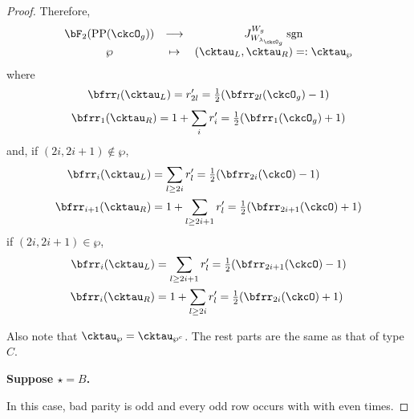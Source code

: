 \documentclass[12pt,a4paper]{amsart}
\newcommand{\sgn}{\operatorname{sgn}}
\numberwithin{equation}{section}
\theoremstyle{remark}
\def\half{{\tfrac{1}{2}}}
\def\lamckg{\lambda_{\ckcO_g}}
\def\CPP{\mathrm{PP}}
\begin{document}
\begin{proof}
{      Therefore,
      \[
        \begin{array}{ccc}
          \bF_{2}(\CPP(\ckcO_{g}))&\longrightarrow
          & J_{W_{\lamckg}}^{W_{g}} \sgn \\
          \wp&\mapsto&    (\cktau_{L},\cktau_{R}) =:\cktau_{\wp}
        \end{array}
      \]
      where
      \[
        \bfrr_{l}(\cktau_{L}) = r'_{2l} = \half (\bfrr_{2l}(\ckcO_{g})-1)
      \]
      \[
        \bfrr_{1}(\cktau_{R}) = 1+ \sum_{i} r'_{i} = \half (\bfrr_{1}(\ckcO_{g})+1)
      \]
      and, if $(2i,2i+1)\notin \wp$,
      \[
        \begin{split}
          \bfrr_{i}(\cktau_{L}) & = \sum_{l\geq 2i} r'_{l}
          = \half(\bfrr_{2i}(\ckcO)-1)\\
          \bfrr_{i+1}(\cktau_{R}) & = 1 + \sum_{l\geq 2i+1} r'_{l} = \half(\bfrr_{2i+1}(\ckcO)+1)
        \end{split}
      \]
      if $(2i,2i+1)\in \wp$,
      \[
        \begin{split}
          \bfrr_{i}(\cktau_{L}) & = \sum_{l\geq 2i+1} r'_{l}
          = \half(\bfrr_{2i+1}(\ckcO)-1)\\
          \bfrr_{i}(\cktau_{R}) & = 1 + \sum_{l\geq 2i} r'_{l} = \half(\bfrr_{2i}(\ckcO)+1)
        \end{split}
      \]

      Also note that $\cktau_{\wp}=\cktau_{\wp^{c}}$. The rest parts are the
      same as that of type $C$.

      {\bf Suppose $\star=B$. }

      In this case, bad parity is odd and every odd row occurs with with even
      times.

}
\end{proof}
\end{document}
